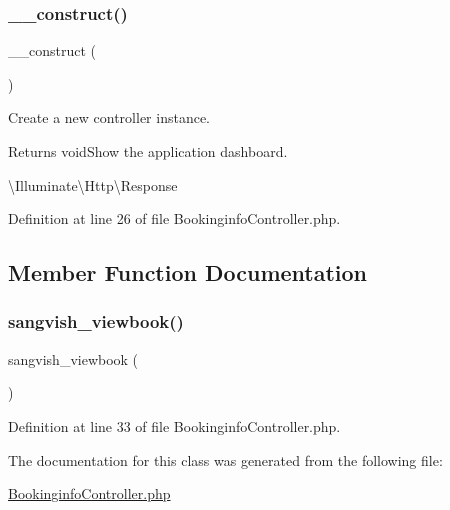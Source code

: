 \subsubsection{\texorpdfstring{\_\_construct()}{\_\_construct()}}
{\footnotesize\ttfamily \+\_\+\+\_\+construct (\begin{DoxyParamCaption}{ }\end{DoxyParamCaption})}

Create a new controller instance.

\begin{DoxyReturn}{Returns}
void\+Show the application dashboard.

\textbackslash{}\+Illuminate\textbackslash{}\+Http\textbackslash{}\+Response 
\end{DoxyReturn}


Definition at line 26 of file Bookinginfo\+Controller.\+php.



\subsection{Member Function Documentation}
\mbox{\label{class_responsive_1_1_http_1_1_controllers_1_1_bookinginfo_controller_a16061151d23f6818db0abadb45f36a60}} 
\subsubsection{\texorpdfstring{sangvish\_viewbook()}{sangvish\_viewbook()}}
{\footnotesize\ttfamily sangvish\+\_\+viewbook (\begin{DoxyParamCaption}{ }\end{DoxyParamCaption})}



Definition at line 33 of file Bookinginfo\+Controller.\+php.



The documentation for this class was generated from the following file\+:\begin{DoxyCompactItemize}
\item 
\mbox{\hyperlink{_bookinginfo_controller_8php}{Bookinginfo\+Controller.\+php}}\end{DoxyCompactItemize}
